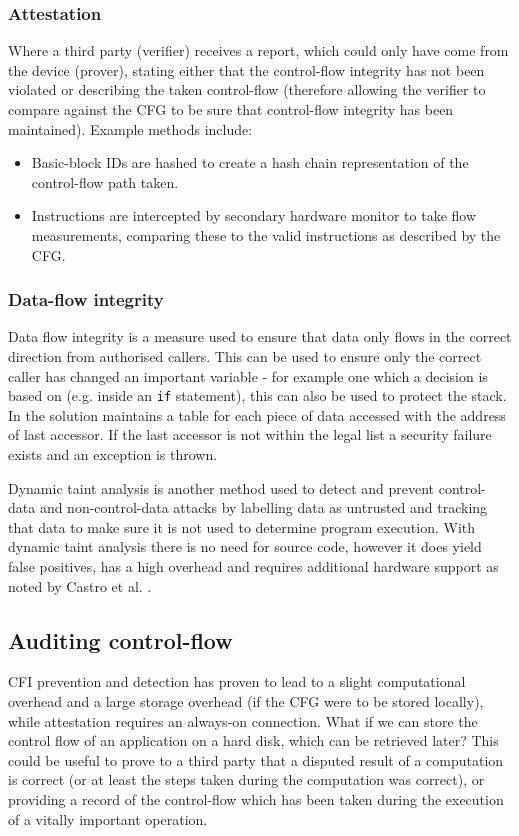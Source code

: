 \subsubsection*{Attestation}
Where a third party (verifier) receives a report, which could only have come from the device (prover), stating either that the control-flow integrity has not been violated or describing the taken control-flow (therefore allowing the verifier to compare against the CFG to be sure that control-flow integrity has been maintained). Example methods include:
\begin{itemize}
	\item Basic-block IDs are hashed to create a hash chain representation of the control-flow path taken.
	\item Instructions are intercepted by secondary hardware monitor to take flow measurements, comparing these to the valid instructions as described by the CFG.
\end{itemize}

\subsubsection*{Data-flow integrity}

Data flow integrity \cite{Castro2006} is a measure used to ensure that data only flows in the correct direction from authorised callers. This can be used to ensure only the correct caller has changed an important variable - for example one which a decision is based on (e.g. inside an \verb|if| statement), this can also be used to protect the stack.
In  \cite{Castro2006} the solution maintains a table for each piece of data accessed with the address of last accessor. If the last accessor is not within the legal list a security failure exists and an exception is thrown.

Dynamic taint analysis \cite{Davi2009} is another method used to detect and prevent control-data and non-control-data attacks by labelling data as untrusted and tracking that data to make sure it is not used to determine program execution. With dynamic taint analysis there is no need for source code, however it does yield false positives, has a high overhead and requires additional hardware support as noted by Castro et al. \cite{Castro2006}.

\subsection{Auditing control-flow}
CFI prevention and detection has proven to lead to a slight computational overhead \cite{DeClercq2017} and a large storage overhead (if the CFG were to be stored locally), while attestation requires an always-on connection. What if we can store the control flow of an application on a hard disk, which can be retrieved later? This could be useful to prove to a third party that a disputed result of a computation is correct (or at least the steps taken during the computation was correct), or providing a record of the control-flow which has been taken during the execution of a  vitally important operation.

